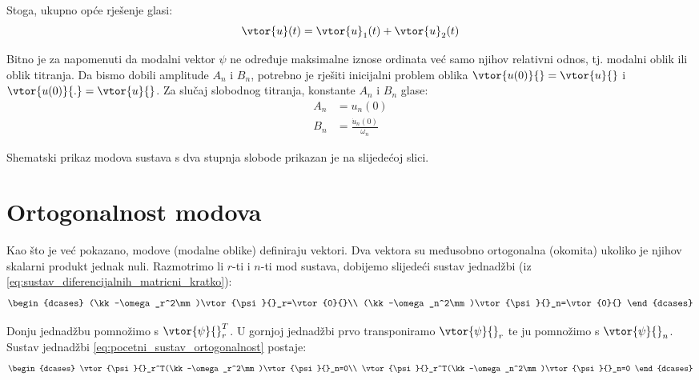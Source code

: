 Stoga, ukupno opće rješenje glasi:
\begin{equation}\label{eq:ukupno_opce_rjesenje_2dof}
    \vtor{u}(t)=\vtor{u}_1(t)+\vtor{u}_2(t)
\end{equation}

Bitno je za napomenuti da modalni vektor $\psi$ ne određuje maksimalne iznose
ordinata već samo njihov relativni odnos, tj. modalni oblik ili oblik titranja. Da
bismo dobili amplitude $A_n$ i $B_n$, potrebno je rješiti inicijalni problem oblika 
$\vtor{u(0)}{} = \vtor{u}{}$ i $\vtor{u(0)}{.}=\vtor{u}{}$. Za slučaj slobodnog titranja,
konstante $A_n$ i $B_n$ glase:
\begin{align}
    A_n&=u_n(0)\\
    B_n&=\frac{\dot{u}_n(0)}{\omega_n}
\end{align}

Shematski prikaz modova sustava s dva stupnja slobode prikazan je na slijedećoj
slici.

\section{Ortogonalnost modova}
Kao što je već pokazano, modove (modalne oblike) definiraju vektori. Dva vektora su
međusobno ortogonalna (okomita) ukoliko je njihov skalarni produkt jednak nuli.
Razmotrimo li $r$-ti i $n$-ti mod sustava, dobijemo slijedeći sustav jednadžbi 
(iz \eqref{eq:sustav_diferencijalnih_matricni_kratko}):
\begin{equation}\label{eq:pocetni_sustav_ortogonalnost}
    \begin{dcases}
        (\kk-\omega_r^2\mm)\vtor{\psi}{}_r=\vtor{0}{}\\
        (\kk-\omega_n^2\mm)\vtor{\psi}{}_n=\vtor{0}{}
    \end{dcases}
\end{equation}

Donju jednadžbu pomnožimo s $\vtor{\psi}{}_r^T$. U gornjoj jednadžbi prvo
transponiramo $\vtor{\psi}{}_r$ te ju pomnožimo s $\vtor{\psi}{}_n$. Sustav jednadžbi
\eqref{eq:pocetni_sustav_ortogonalnost} postaje:
\begin{equation}\label{eq:konacni_sustav_ortogonalnost}
    \begin{dcases}
        \vtor{\psi}{}_r^T(\kk-\omega_r^2\mm)\vtor{\psi}{}_n=0\\
        \vtor{\psi}{}_r^T(\kk-\omega_n^2\mm)\vtor{\psi}{}_n=0
    \end{dcases}
\end{equation}

